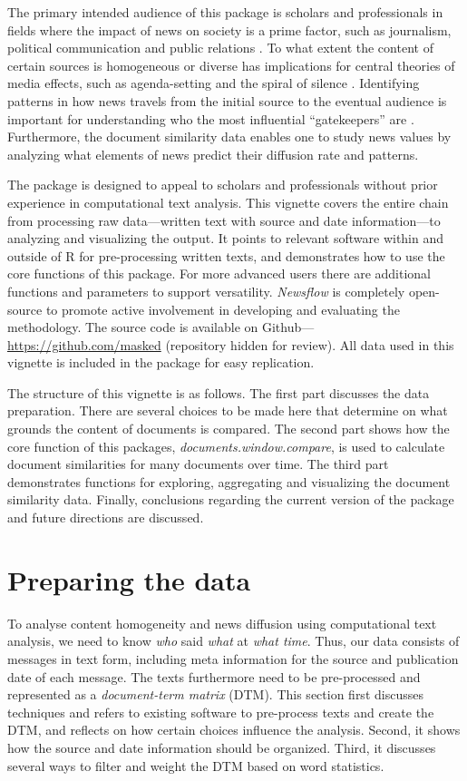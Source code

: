 The primary intended audience of this package is scholars and
professionals in fields where the impact of news on society is a prime
factor, such as journalism, political communication and public relations
\citep{baum08,boczkowski07,ragas14}. To what extent the content of
certain sources is homogeneous or diverse has implications for central
theories of media effects, such as agenda-setting and the spiral of
silence \citep{bennett08,blumler99}. Identifying patterns in how news
travels from the initial source to the eventual audience is important
for understanding who the most influential ``gatekeepers'' are
\citep{shoemaker09}. Furthermore, the document similarity data enables
one to study news values \citep{galtung65} by analyzing what elements of
news predict their diffusion rate and patterns.

The package is designed to appeal to scholars and professionals without
prior experience in computational text analysis. This vignette covers
the entire chain from processing raw data---written text with source and
date information---to analyzing and visualizing the output. It points to
relevant software within and outside of R for pre-processing written
texts, and demonstrates how to use the core functions of this package.
For more advanced users there are additional functions and parameters to
support versatility. \emph{Newsflow} is completely open-source to
promote active involvement in developing and evaluating the methodology.
The source code is available on Github---\url{https://github.com/masked}
(repository hidden for review). All data used in this vignette is
included in the package for easy replication.

The structure of this vignette is as follows. The first part discusses
the data preparation. There are several choices to be made here that
determine on what grounds the content of documents is compared. The
second part shows how the core function of this packages,
\emph{documents.window.compare}, is used to calculate document
similarities for many documents over time. The third part demonstrates
functions for exploring, aggregating and visualizing the document
similarity data. Finally, conclusions regarding the current version of
the package and future directions are discussed.

\section{Preparing the data}

To analyse content homogeneity and news diffusion using computational
text analysis, we need to know \emph{who} said \emph{what} at
\emph{what time}. Thus, our data consists of messages in text form,
including meta information for the source and publication date of each
message. The texts furthermore need to be pre-processed and represented
as a \emph{document-term matrix} (DTM). This section first discusses
techniques and refers to existing software to pre-process texts and
create the DTM, and reflects on how certain choices influence the
analysis. Second, it shows how the source and date information should be
organized. Third, it discusses several ways to filter and weight the DTM
based on word statistics.

